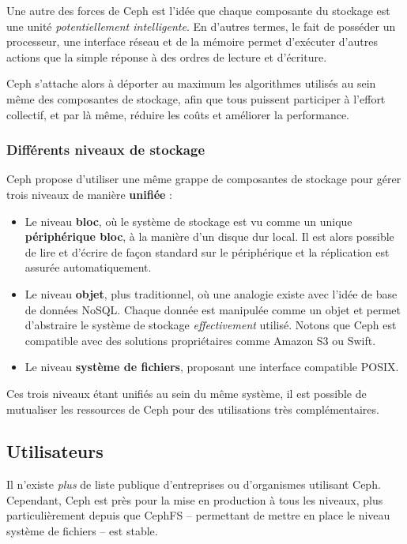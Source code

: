 Une autre des forces de Ceph est l'idée que chaque composante du stockage est une unité \textit{potentiellement intelligente}. En d'autres termes, le fait de posséder un processeur, une interface réseau et de la mémoire permet d'exécuter d'autres actions que la simple réponse à des ordres de lecture et d'écriture.

Ceph s'attache alors à déporter au maximum les algorithmes utilisés au sein même des composantes de stockage, afin que tous puissent participer à l'effort collectif, et par là même, réduire les coûts et améliorer la performance.

\subsubsection{Différents niveaux de stockage}

Ceph propose d'utiliser une même grappe de composantes de stockage pour gérer trois niveaux de manière \textbf{unifiée} :

\begin{itemize}
	\item Le niveau \textbf{bloc}, où le système de stockage est vu comme un unique \textbf{périphérique bloc}, à la manière d'un disque dur local. Il est alors possible de lire et d'écrire de façon standard sur le périphérique et la réplication est assurée automatiquement.
    \item Le niveau \textbf{objet}, plus traditionnel, où une analogie existe avec l'idée de base de données NoSQL. Chaque donnée est manipulée comme un objet et permet d'abstraire le système de stockage \textit{effectivement} utilisé. Notons que Ceph est compatible avec des solutions propriétaires comme Amazon S3 ou Swift.
    \item Le niveau \textbf{système de fichiers}, proposant une interface compatible POSIX.
\end{itemize}

Ces trois niveaux étant unifiés au sein du même système, il est possible de mutualiser les ressources de Ceph pour des utilisations très complémentaires.

\subsection{Utilisateurs}

Il n'existe \textit{plus} de liste publique d'entreprises ou d'organismes utilisant Ceph. Cependant, Ceph est près pour la mise en production à tous les niveaux, plus particulièrement depuis que CephFS -- permettant de mettre en place le niveau système de fichiers -- est stable.

